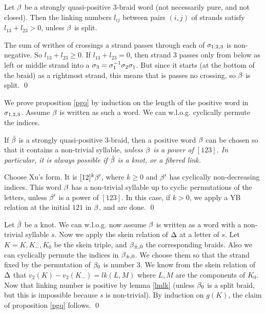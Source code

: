 \begin{lemma}\label{lmlk}
Let $\beta$ be a strongly quasi-positive 3-braid word
(not necessarily pure, and not closed). Then the
linking numbers $l_{ij}$ between pairs $(i,j)$ of 
strands satisfy $l_{13}+l_{23}>0$, unless $\beta$ is split.
\end{lemma}

\proof The sum of writhes of crossings a strand passes
through each of $\sigma_{1,2,3}$ is non-negative. So
$l_{13}+l_{23}\ge 0$. If $l_{13}+l_{23}=0$, then
strand 3 passes only from below as left or middle
strand into a $\sigma_3=\sigma_1^{-1}\sigma_2\sigma_1$. But since it
starts (at the bottom of the braid) as a rightmost 
strand, this means that is passes no crossing, so $\beta$ is split. 
\qed

We prove proposition \ref{pgq}
by induction on the length of the positive word
in $\sigma_{1,2,3}$. Assume $\beta$ is written as such a word.
We can w.l.o.g. cyclically permute the indices. 

\begin{lemma}
If $\hat{\beta}$ is a strongly quasi-positive 3-braid, then a positive 
word $\beta$ can be chosen so that it contains a non-trivial syllable,
\em{unless} $\beta$ is a power of $[123]$. In particular, it is 
always possible if $\hat{\beta}$ is a knot, or a fibered link.
\end{lemma}

\proof Choose Xu's form. It is $[12]^k\beta'$, where $k\ge 0$ and $\beta'$ 
has cyclically non-decreasing indices. This word $\beta$ has a non-trivial
syllable up to cyclic permutations of the letters, unless $\beta'$
is a power of $[123]$. In this case, if $k>0$, we apply a YB relation 
at the initial $121$ in $\beta$, and are done. \qed

 Let $\hat{\beta}$ be a knot. 
We can w.l.o.g. now assume $\beta$ is written as a word with a 
non-trivial syllable $s$. Now we apply the skein relation
of $\Delta$ at a letter of $s$. Let $K=K,K_-,K_0$ be the skein
triple, and $\beta_{\pm,0}$ the corresponding braids. Also we can 
cyclically permute the indices in $\beta_{\pm,0}$. We choose them so 
that the strand fixed by the permutation of $\beta_0$ is number 3. We 
know from the skein relation of $\Delta$ 
that $v_2(K)-v_2(K_-)=lk(L,M)$ where $L,M$ are the components 
of $K_0$. Now that linking number is positive by lemma \ref{lmlk} 
(unless $\beta_0$ is a split braid, but this is impossible because $s$
is non-trivial). By induction on $g(K)$, the claim of proposition
\ref{pgq} follows. \qed



